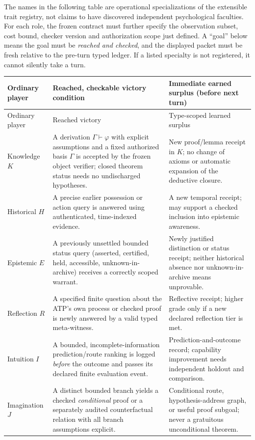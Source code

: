 \documentclass[11pt,letterpaper]{article}
\theoremstyle{definition}
\theoremstyle{plain}
\theoremstyle{definition}
\begin{document}
The names in the following table are operational specializations of the extensible trait registry, not claims to have discovered independent psychological faculties. For each role, the frozen contract must further specify the observation subset, cost bound, checker version and authorization scope just defined. A ``goal'' below means the goal must be \emph{reached and checked}, and the displayed packet must be fresh relative to the pre-turn typed ledger. If a listed specialty is not registered, it cannot silently take a turn.

\small
\begin{longtable}{@{}p{.155\linewidth}p{.355\linewidth}p{.395\linewidth}@{}}
\toprule
Ordinary player & Reached, checkable victory condition & Immediate earned surplus (before next turn)\\\midrule
\endfirsthead
\toprule Ordinary player & Reached victory & Type-scoped learned surplus\\\midrule
\endhead
Knowledge $K$ & A derivation $\Gamma\vdash\varphi$ with explicit assumptions and a fixed authorized basis $\Gamma$ is accepted by the frozen object verifier; closed theorem status needs no undischarged hypotheses. & New proof/lemma receipt in $K$; no change of axioms or automatic expansion of the deductive closure.\\[3pt]
Historical $H$ & A precise earlier possession or action query is answered using authenticated, time-indexed evidence. & A new temporal receipt; may support a checked inclusion into epistemic awareness.\\[3pt]
Epistemic $E$ & A previously unsettled bounded status query (asserted, certified, held, accessible, unknown-in-archive) receives a correctly scoped warrant. & Newly justified distinction or status receipt; neither historical absence nor unknown-in-archive means unprovable.\\[3pt]
Reflection $R$ & A specified finite question about the ATP's own process or checked proof is newly answered by a valid typed meta-witness. & Reflective receipt; higher grade only if a new declared reflection tier is met.\\[3pt]
Intuition $I$ & A bounded, incomplete-information prediction/route ranking is logged \emph{before} the outcome and passes its declared finite evaluation event. & Prediction-and-outcome record; capability improvement needs independent holdout and comparison.\\[3pt]
Imagination $J$ & A distinct bounded branch yields a checked \emph{conditional} proof or a separately audited counterfactual relation with all branch assumptions explicit. & Conditional route, hypothesis-address graph, or useful proof subgoal; never a gratuitous unconditional theorem.\\[3pt]

\end{longtable}
\end{document}
